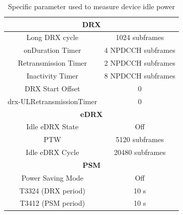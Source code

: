 \begin{table}[H]
\centering
\begin{tabular}{|c|c|} \hline
\multicolumn{2}{|c|}{\textbf{DRX}}  	 \\ \hline
Long DRX cycle     	& 1024 subframes 	 \\ \hline
onDuration Timer   	& 4 NPDCCH subframes \\ \hline
Retransmission Timer & 2 NPDCCH subframes \\ \hline
Inactivity Timer   	& 8 NPDCCH subframes \\ \hline
DRX Start Offset   	& 0              	 \\ \hline
drx-ULRetransmissionTimer & 0       	 \\ \hline
\multicolumn{2}{|c|}{\textbf{eDRX}} 	 \\ \hline
Idle eDRX State		& Off				 \\ \hline
\gls{PTW}			& 5120 subframes 	 \\ \hline
Idle eDRX Cycle     & 20480 subframes	 \\ \hline
\multicolumn{2}{|c|}{\textbf{PSM}}  	 \\ \hline
Power Saving Mode	& Off				 \\ \hline
T3324 (DRX period)	& 10 s    			 \\ \hline
T3412 (PSM period)	& 10 s		  		 \\ \hline
\end{tabular}
\caption{Specific parameter used to measure device idle power}
\label{tab:UXM_idle_values}
\end{table}





